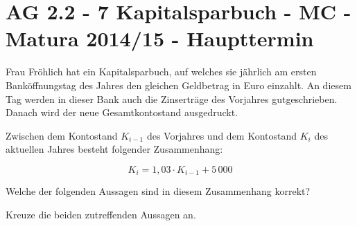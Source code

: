 \section{AG 2.2 - 7 Kapitalsparbuch - MC - Matura 2014/15 - Haupttermin}

\begin{beispiel}[AG 2.2]{1} %
Frau Fröhlich hat ein Kapitalsparbuch, auf welches sie jährlich am ersten Bank\-öffnungstag des Jahres den gleichen Geldbetrag in Euro einzahlt. An diesem Tag werden in dieser Bank auch die
Zinserträge des Vorjahres gutgeschrieben. Danach wird der neue Gesamtkontostand ausgedruckt. \leer

Zwischen dem Kontostand $K_{i-1}$ des Vorjahres und dem Kontostand $K_i$ des aktuellen Jahres besteht folgender Zusammenhang: 

$$K_i=1,03\cdot K_{i-1} + 5\,000$$

Welche der folgenden Aussagen sind in diesem Zusammenhang korrekt?

Kreuze die beiden zutreffenden Aussagen an.

\end{beispiel}